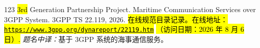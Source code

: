 \begin{thebibliography}{123}
{\hl{3rd}  Generation Partnership Project}.
\newblock Maritime Communication Services over {3GPP} System.
\newblock 3GPP TS 22.119,  2026.
\newblock \hl{在线规范目录记录。}\space \hl{在线地址：}\space \href{https://www.3gpp.org/dynareport/22119.htm}{\hl{\mbox{\nolinkurl{https://www.3gpp.org/}}}}\allowbreak\href{https://www.3gpp.org/dynareport/22119.htm}{\hl{\mbox{\nolinkurl{dynareport/}}}}\allowbreak\href{https://www.3gpp.org/dynareport/22119.htm}{\hl{\mbox{\nolinkurl{22119.htm}}}} \space\hl{（访问日期：2026 年 8 月 6 日）.}
\newblock \textit{题名中译：}基于 3GPP 系统的海事通信服务。

\end{thebibliography}
